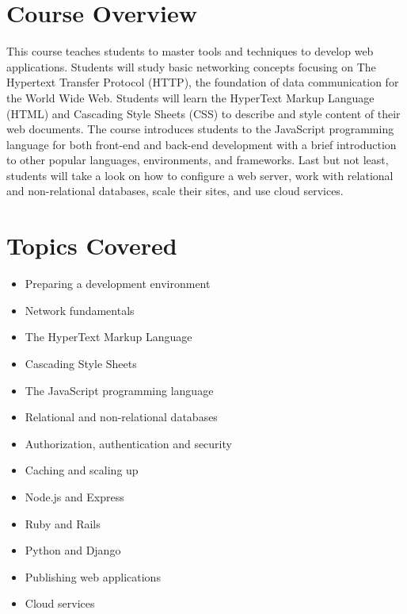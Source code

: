\documentclass[12pt,a4paper,oneside]{article}
\begin{document}
    \section{Course Overview}

        This course teaches students to master tools and techniques to develop
        web applications. Students will study basic networking concepts focusing
        on The Hypertext Transfer Protocol (HTTP), the foundation of data
        communication for the World Wide Web. Students will learn the HyperText
        Markup Language (HTML) and Cascading Style Sheets (CSS) to describe and
        style content of their web documents. The course introduces students to
        the JavaScript programming language for both front-end and back-end
        development with a brief introduction to other popular languages,
        environments, and frameworks. Last but not least, students will take a
        look on how to configure a web server, work with relational and
        non-relational databases, scale their sites, and use cloud services.

    \section{Topics Covered}

        \begin{itemize}
            \item Preparing a development environment
            \item Network fundamentals
            \item The HyperText Markup Language
            \item Cascading Style Sheets
            \item The JavaScript programming language
            \item Relational and non-relational databases
            \item Authorization, authentication and security
            \item Caching and scaling up
            \item Node.js and Express
            \item Ruby and Rails
            \item Python and Django
            \item Publishing web applications
            \item Cloud services
        \end{itemize}
\end{document}
